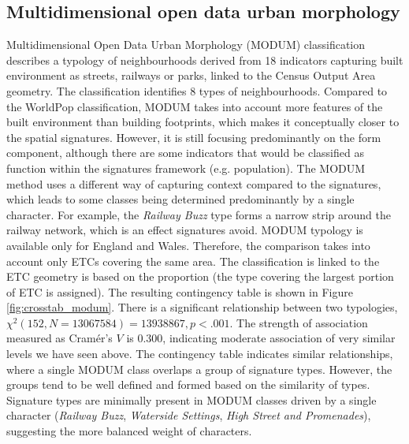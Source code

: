 \documentclass[fleqn,10pt]{wlscirep}
\begin{document}
\subsection*{Multidimensional open data urban morphology}
Multidimensional Open Data Urban Morphology (MODUM) classification describes a typology
of neighbourhoods derived from 18 indicators capturing built environment as streets,
railways or parks, linked to the Census Output Area geometry. The classification
identifies 8 types of neighbourhoods.
Compared to the WorldPop classification, MODUM takes into account more features of
the built environment than building footprints, which makes it conceptually closer to the
spatial signatures. However, it is still focusing predominantly on the form component,
although there are some indicators that would be classified as function within the
signatures framework (e.g. population). The MODUM method uses a different way of
capturing context compared to the signatures, which leads to some classes being
determined predominantly by a single character. For example, the \textit{Railway Buzz} type
forms a narrow strip around the railway network, which is an effect signatures avoid.
MODUM typology is available only for England and Wales. Therefore, the comparison takes
into account only ETCs covering the same area. The classification is linked to the
ETC geometry is based on the proportion (the type covering the largest portion of ETC is
assigned). The resulting contingency table is shown in Figure \ref{fig:crosstab_modum}. There is a
significant relationship between two typologies, $\chi^{2} (152, N = 13067584) =
13938867, p < .001$. The strength of association measured as Cramér's $V$ is $0.300$,
indicating moderate association of very similar levels we have seen above. The
contingency table indicates similar relationships, where a single MODUM class overlaps a
group of signature types. However, the groups tend to be well defined and formed based
on the similarity of types. Signature types are minimally present in MODUM classes driven
by a single character (\textit{Railway Buzz}, \textit{Waterside Settings},
\textit{High Street and Promenades}), suggesting the more balanced weight of characters.
\end{document}
